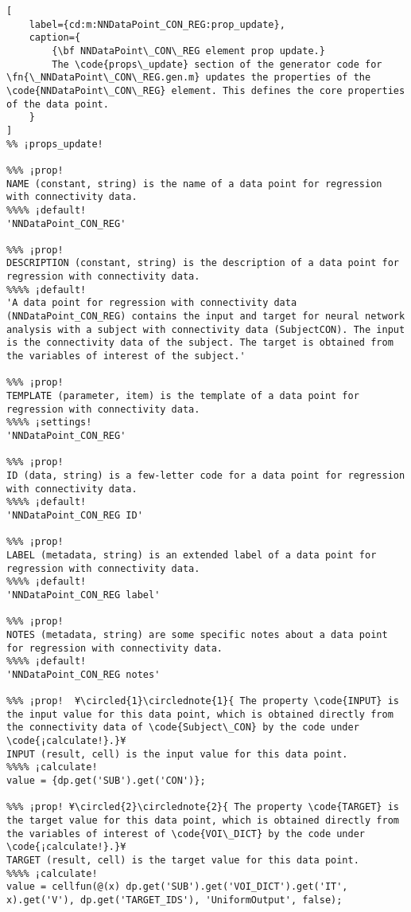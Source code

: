 \documentclass{tufte-handout}
\begin{document}
\begin{lstlisting}[
	label={cd:m:NNDataPoint_CON_REG:prop_update},
	caption={
		{\bf NNDataPoint\_CON\_REG element prop update.}
		The \code{props\_update} section of the generator code for \fn{\_NNDataPoint\_CON\_REG.gen.m} updates the properties of the \code{NNDataPoint\_CON\_REG} element. This defines the core properties of the data point.
	}
]
%% ¡props_update!

%%% ¡prop!
NAME (constant, string) is the name of a data point for regression with connectivity data.
%%%% ¡default!
'NNDataPoint_CON_REG'

%%% ¡prop!
DESCRIPTION (constant, string) is the description of a data point for regression with connectivity data.
%%%% ¡default!
'A data point for regression with connectivity data (NNDataPoint_CON_REG) contains the input and target for neural network analysis with a subject with connectivity data (SubjectCON). The input is the connectivity data of the subject. The target is obtained from the variables of interest of the subject.'

%%% ¡prop!
TEMPLATE (parameter, item) is the template of a data point for regression with connectivity data.
%%%% ¡settings!
'NNDataPoint_CON_REG'

%%% ¡prop!
ID (data, string) is a few-letter code for a data point for regression with connectivity data.
%%%% ¡default!
'NNDataPoint_CON_REG ID'

%%% ¡prop!
LABEL (metadata, string) is an extended label of a data point for regression with connectivity data.
%%%% ¡default!
'NNDataPoint_CON_REG label'

%%% ¡prop!
NOTES (metadata, string) are some specific notes about a data point for regression with connectivity data.
%%%% ¡default!
'NNDataPoint_CON_REG notes'

%%% ¡prop!  ¥\circled{1}\circlednote{1}{ The property \code{INPUT} is the input value for this data point, which is obtained directly from the connectivity data of \code{Subject\_CON} by the code under \code{¡calculate!}.}¥
INPUT (result, cell) is the input value for this data point.
%%%% ¡calculate!
value = {dp.get('SUB').get('CON')};
    
%%% ¡prop! ¥\circled{2}\circlednote{2}{ The property \code{TARGET} is the target value for this data point, which is obtained directly from the variables of interest of \code{VOI\_DICT} by the code under \code{¡calculate!}.}¥
TARGET (result, cell) is the target value for this data point.
%%%% ¡calculate!
value = cellfun(@(x) dp.get('SUB').get('VOI_DICT').get('IT', x).get('V'), dp.get('TARGET_IDS'), 'UniformOutput', false);

\end{lstlisting}
\end{document}

